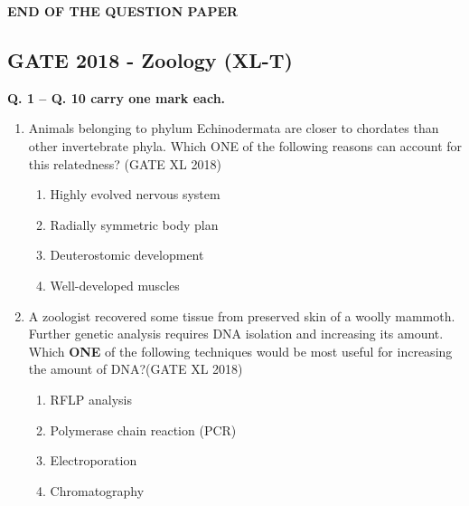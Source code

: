 \documentclass[14pt]{extarticle}
\begin{document}
\begin{flushleft}
\begin{enumerate}
\end{enumerate}
\begin{center}
    \textbf{END OF THE QUESTION PAPER}
\end{center}
\clearpage

\begin{center}
\section*{GATE 2018 - Zoology (XL-T)}
\end{center}

\textbf{Q. 1 – Q. 10 carry one mark each.}\vspace{0.5em}


\begin{enumerate}
    \item Animals belonging to phylum Echinodermata are closer to chordates than other invertebrate phyla. Which ONE of the following reasons can account for this relatedness? \hfill(GATE XL 2018)\\
    \begin{multicols}{2}
    \begin{enumerate}[label=(\Alph*)]
        \item Highly evolved nervous system
        \item Radially symmetric body plan
        \item Deuterostomic development
        \item Well-developed muscles
    \end{enumerate}
    \end{multicols}

    \item A zoologist recovered some tissue from preserved skin of a woolly mammoth. Further genetic analysis requires DNA isolation and increasing its amount. Which \textbf{ONE} of the following techniques would be most useful for increasing the amount of DNA?\hfill(GATE XL 2018)\\
    \begin{multicols}{2}
    \begin{enumerate}[label=(\Alph*)]
        \item RFLP analysis
        \item Polymerase chain reaction (PCR)
        \item Electroporation
        \item Chromatography
    \end{enumerate}
    \end{multicols}


\end{enumerate}
\end{flushleft}
\end{document}
